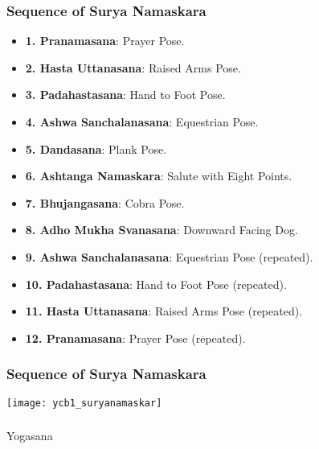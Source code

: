 \begin{frame}[fragile]\frametitle{Sequence of Surya Namaskara}

      \begin{itemize}
        \item \textbf{1. Pranamasana}: Prayer Pose.
        \item \textbf{2. Hasta Uttanasana}: Raised Arms Pose.
        \item \textbf{3. Padahastasana}: Hand to Foot Pose.
        \item \textbf{4. Ashwa Sanchalanasana}: Equestrian Pose.
        \item \textbf{5. Dandasana}: Plank Pose.
        \item \textbf{6. Ashtanga Namaskara}: Salute with Eight Points.
        \item \textbf{7. Bhujangasana}: Cobra Pose.
        \item \textbf{8. Adho Mukha Svanasana}: Downward Facing Dog.
        \item \textbf{9. Ashwa Sanchalanasana}: Equestrian Pose (repeated).
        \item \textbf{10. Padahastasana}: Hand to Foot Pose (repeated).
        \item \textbf{11. Hasta Uttanasana}: Raised Arms Pose (repeated).
        \item \textbf{12. Pranamasana}: Prayer Pose (repeated).
      \end{itemize}
 
\end{frame}

\begin{frame}[fragile]\frametitle{Sequence of Surya Namaskara}

        \begin{center}
        \texttt{[image: ycb1\_suryanamaskar]}
        \end{center}	

\end{frame}



\begin{frame}[fragile]\frametitle{}
\begin{center}
{\Large Yogasana}
\end{center}
\end{frame}


